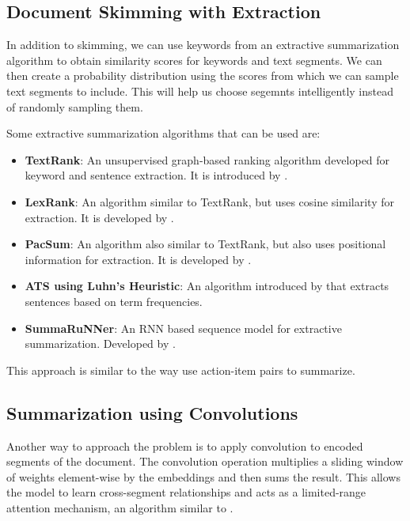 \subsection{Document Skimming with Extraction}

In addition to skimming, we can use keywords from an extractive summarization
algorithm to obtain similarity scores for keywords and text segments.
We can then create a probability distribution using the scores from which we can sample
text segments to include.
This will help us choose segemnts intelligently instead of randomly sampling them.

Some extractive summarization algorithms that can be used are:

\begin{itemize}
	\item \textbf{TextRank}: An unsupervised graph-based ranking algorithm developed for
	keyword and sentence extraction. It is introduced by
	\citet{mihalcea-tarau-2004-textrank}.
	\item \textbf{LexRank}: An algorithm similar to TextRank, but uses cosine similarity
	for extraction. It is developed by \citet{erkan2004lexrank}.
	\item \textbf{PacSum}: An algorithm also similar to TextRank, but also uses
	positional information for extraction. It is developed by
	\citet{zheng-lapata-2019-sentence}.
	\item \textbf{ATS using Luhn's Heuristic}: An algorithm introduced by
	\citet{siddika2022automatic} that extracts sentences based on term frequencies.
	\item \textbf{SummaRuNNer}: An RNN based sequence model for extractive summarization.
	Developed by \citet{nallapati2017summarunner}.
\end{itemize}

This approach is similar to the way \citet{golia2024action} use action-item
pairs to summarize.


\subsection{Summarization using Convolutions}

Another way to approach the problem is to apply convolution to encoded segments of
the document.
The convolution operation multiplies a sliding window of weights element-wise by the
embeddings and then sums the result.
This allows the model to learn cross-segment relationships and acts as a
limited-range attention mechanism, an algorithm similar to \citet{chen2022long}.

